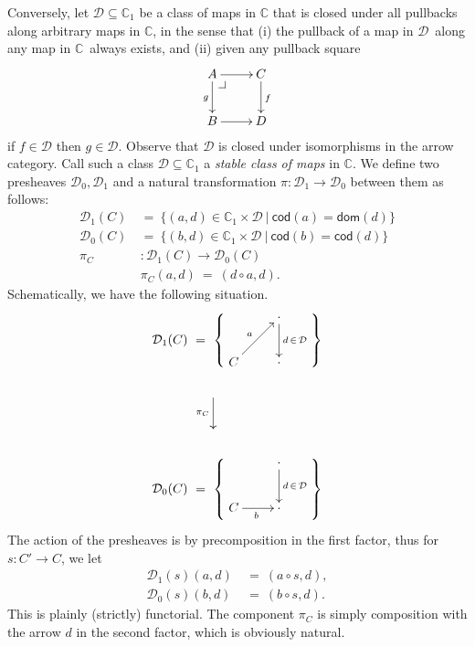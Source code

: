 \documentclass[12pt]{article}
\makeatletter
\newcommand{\C}{\ensuremath{\mathbb{C}}}
\newcommand{\D}{\ensuremath{\mathcal{D}}}
\newcommand{\pbcorner}[1][dr]{\save*!/#1-1.2pc/#1:(-1,1)@^{|-}\restore}
\newcommand{\dom}{\ensuremath{\mathsf{dom}}}
\newcommand{\cod}{\ensuremath{\mathsf{cod}}}
\theoremstyle{definition}
\makeatother
\begin{document}
Conversely, let $\D\subseteq\C_1$ be a class of maps in $\C$ that is closed under all pullbacks along arbitrary maps in $\C$, in the sense that (i) the pullback of a map in \D\ along any map in \C\ always exists, and (ii) given any pullback square 
\begin{equation}%
\xymatrix{
A\ar[d]_{g} \ar[r] \pbcorner &  C\ar[d]^{f}\\
B \ar[r]   & D}
\end{equation}
if $f\in\D$ then $g\in\D$.  Observe that $\D$ is closed under isomorphisms in the arrow category.  Call such a class $\D\subseteq\C_1$  a \emph{stable class of maps} in $\C$.  We define two presheaves $\D_0, \D_1$ and a natural transformation $\pi : \D_1\to\D_0$ between them as follows:
\begin{align*}
\D_1(C)\ &=\ \{ (a, d)\in \C_1\times \D\ |\ \cod(a) = \dom(d) \} \\
\D_0(C)\ &=\ \{ (b, d) \in  \C_1\times \D\ |\ \cod(b) = \cod(d) \}\\
\pi_C &: \D_1(C) \to \D_0(C) \\
& \pi_C(a,d)\ =\ (d\circ a, d).
\end{align*}
Schematically, we have the following situation.
\begin{align*}
\D_1(C)\ &=\ \left\{ \vcenter{ \xymatrix{& \cdot \ar[d]^{d\,\in\,\D} \\
				C\ar[ru]^{a} & \cdot} }
			\right \}	\\
		&\xymatrix{ \strut \ar[d]_{\pi_C}\\
		\strut } \\
\D_0(C)\ &=\ \left\{ \vcenter{ \xymatrix{& \cdot \ar[d]^{d\,\in\,\D} \\
				C \ar[r]_{b} & \cdot} }
			\right\}
\end{align*}
The action of the presheaves is by precomposition in the first factor, thus for $s : C' \to C$, we let
\begin{align*}
\D_1(s)(a, d)\ &=\ (a\circ s, d), \\
\D_0(s)(b, d)\ &=\ (b\circ s, d) .
\end{align*}
This is plainly (strictly) functorial.  The component $\pi_C$ is simply composition with the arrow $d$ in the second factor, 
which is obviously natural.
\end{document}
